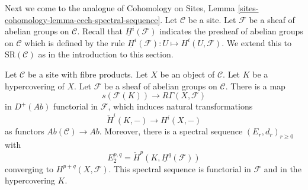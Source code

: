 \noindent
Next we come to the analogue of Cohomology on Sites, Lemma
\ref{sites-cohomology-lemma-cech-spectral-sequence}.
Let $\mathcal{C}$ be a site.
Let $\mathcal{F}$ be a sheaf of abelian groups on $\mathcal{C}$.
Recall that $\underline{H}^i(\mathcal{F})$ indicates the presheaf
of abelian groups on $\mathcal{C}$ which is defined by the
rule $\underline{H}^i(\mathcal{F}) : U \longmapsto H^i(U, \mathcal{F})$.
We extend this to $\text{SR}(\mathcal{C})$ as in the introduction
to this section.

\begin{lemma}
\label{lemma-cech-spectral-sequence}
Let $\mathcal{C}$ be a site with fibre products.
Let $X$ be an object of $\mathcal{C}$.
Let $K$ be a hypercovering of $X$.
Let $\mathcal{F}$ be a sheaf of abelian groups on $\mathcal{C}$.
There is a map
$$
s(\mathcal{F}(K))
\longrightarrow
R\Gamma(X, \mathcal{F})
$$
in $D^{+}(\textit{Ab})$ functorial in $\mathcal{F}$, which induces
natural transformations
$$
\check{H}^i(K, -) \longrightarrow H^i(X, -)
$$
as functors $\textit{Ab}(\mathcal{C}) \to \textit{Ab}$. Moreover,
there is a spectral sequence $(E_r, d_r)_{r \geq 0}$ with
$$
E_2^{p, q} = \check{H}^p(K, \underline{H}^q(\mathcal{F}))
$$
converging to $H^{p + q}(X, \mathcal{F})$.
This spectral sequence is functorial in $\mathcal{F}$ and
in the hypercovering $K$.
\end{lemma}


